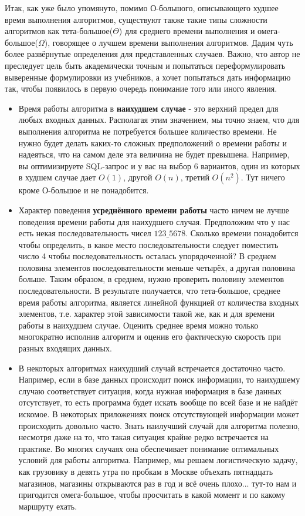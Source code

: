 \documentclass[fontsize=14bp]{report}
\begin{document}
Итак, как уже было упомянуто, помимо О-большого, описывающего худшее время выполнения алгоритмов, существуют также такие типы сложности алгоритмов как тета-большое($\Theta$) для среднего времени выполнения и омега-большое($\Omega$), говорящее о лучшем времени выполнения алгоритмов. Дадим чуть более развёрнутые определения для представленных случаев. Важно, что автор не преследует цель быть академически точным и попытаться переформулировать выверенные формулировки из учебников, а хочет попытаться дать информацию так, чтобы появилось в первую очередь понимание того или иного явления. 
\begin{itemize}
    \item Время работы алгоритма в \textbf{наихудшем случае} - это верхний предел для любых входных данных. Располагая этим значением, мы точно знаем, что для выполнения алгоритма не потребуется большее количество времени. Не нужно будет делать каких-то сложных предположений о времени работы и надеяться, что на самом деле эта величина не будет превышена. Например, вы оптимизируете SQL-запрос и у вас на выбор 6 вариантов, один из которых в худшем случае дает $O(1)$, другой $O(n)$, третий $O(n^2)$. Тут ничего кроме О-большое и не понадобится.
    \item Характер поведения \textbf{усреднённого времени работы} часто ничем не лучше поведения времени работы для наихудшего случая. Предположим что у нас есть некая последовательность чисел $1 2 3 \_ 5 6 7 8$. Сколько времени понадобится чтобы определить, в какое место последовательности следует поместить число 4 чтобы последовательность осталась упорядоченной? В среднем половина элементов последовательности меньше четырёх, а другая половина больше. Таким образом, в среднем, нужно проверить половину элементов последовательности. В результате получается, что тета-большое, среднее время работы алгоритма, является линейной функцией от количества входных элементов, т.е. характер этой зависимости такой же, как и для времени работы в наихудшем случае. Оценить среднее время можно только многократно исполнив алгоритм и оценив его фактическую скорость при разных входящих данных.
    \item В некоторых алгоритмах наихудший случай встречается достаточно часто. Например, если в базе данных происходит поиск информации, то наихудшему случаю соответствует ситуация, когда нужная информация в базе данных отсутствует, то есть программа будет искать вообще по всей базе и не найдёт искомое. В некоторых приложениях поиск отсутствующей информации может происходить довольно часто. Знать наилучший случай для алгоритма полезно, несмотря даже на то, что такая ситуация крайне редко встречается на практике. Во многих случаях она обеспечивает понимание оптимальных условий для работы алгоритма. Например, мы решаем логистическую задачу, как грузовику в девять утра по пробкам в Москве объехать пятнадцать магазинов, магазины открываются раз в год и всё очень плохо...  тут-то нам и пригодится омега-большое, чтобы просчитать в какой момент и по какому маршруту ехать.
\end{itemize}
\end{document}
